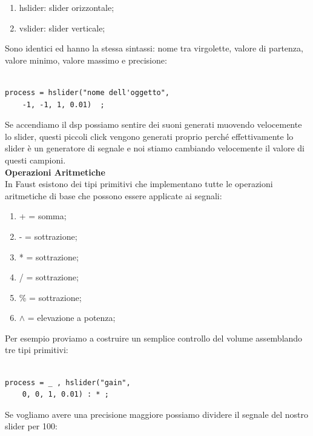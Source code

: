 \documentclass[11pt]{article}
\begin{document}
\begin{multicols*}{2}
\begin{enumerate}
\scriptsize
\item hslider: slider orizzontale; 
\item vslider: slider verticale; 
\end{enumerate}

Sono identici ed hanno la stessa sintassi: nome tra virgolette, valore di partenza, valore minimo, valore massimo e precisione:

\begin{Verbatim}[fontsize=\scriptsize]

process = hslider("nome dell'oggetto", 
	-1, -1, 1, 0.01)  ;

\end{Verbatim}

Se accendiamo il dsp possiamo sentire dei suoni generati muovendo velocemente lo slider, questi piccoli click vengono generati proprio perché effettivamente lo slider è un generatore di segnale e noi stiamo cambiando velocemente il valore di questi campioni.\\

\textbf{Operazioni Aritmetiche}\\

In Faust esistono dei tipi primitivi che implementano tutte le operazioni aritmetiche di base che possono essere applicate ai segnali:

\begin{enumerate}
\scriptsize
\item + = somma; 
\item - = sottrazione; 
\item * = sottrazione; 
\item / = sottrazione; 
\item \% = sottrazione; 
\item $\land$ = elevazione a potenza;
\end{enumerate}

Per esempio proviamo a costruire un semplice controllo del volume assemblando tre tipi primitivi:

\begin{Verbatim}[fontsize=\scriptsize]

process = _ , hslider("gain", 
	0, 0, 1, 0.01) : * ;

\end{Verbatim}

Se vogliamo avere una precisione maggiore possiamo dividere il segnale del nostro slider per 100:

\begin{Verbatim}[fontsize=\scriptsize]


\end{Verbatim}
\end{multicols*}
\end{document}
